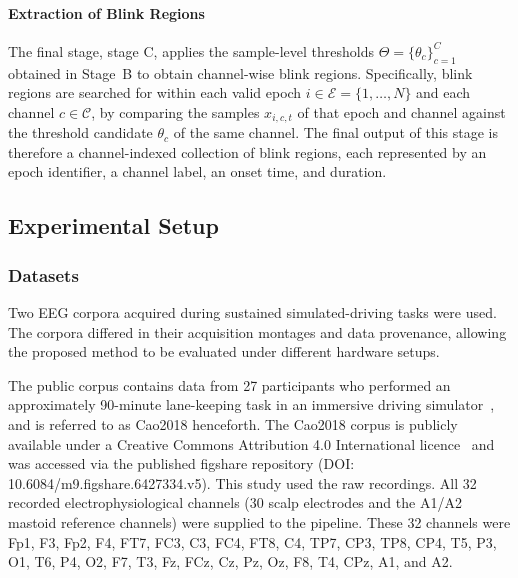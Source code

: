 \documentclass[journal,twoside,web]{ieeecolor}
\begin{document}
\paragraph{Extraction of Blink Regions}
The final stage, stage C, applies the sample-level thresholds
\(\Theta=\{\theta_c\}_{c=1}^{C}\) obtained in Stage~B to obtain channel-wise
blink regions. Specifically, blink regions are searched for within each valid
epoch \(i \in \mathcal{E}=\{1,\ldots,N\}\) and each channel
\(c \in \mathcal{C}\), by comparing the samples \(x_{i,c,t}\) of that epoch and
channel against the threshold candidate \(\theta_c\) of the same channel.
The final output of this stage is therefore a channel-indexed collection of blink regions, each represented by an epoch identifier, a channel label, an onset time, and duration.

%

 
%


\subsection{Experimental Setup}
\label{sec:exp_setup}


\subsubsection{Datasets}
\label{sec:datasets}
%
Two EEG corpora acquired during sustained simulated-driving tasks were used. The corpora differed in their acquisition montages and data provenance, allowing the proposed method to be evaluated under different hardware setups.

The public corpus contains data from 27 participants who performed an approximately 90-minute lane-keeping task in an immersive driving simulator~\citep{cao2019multichannel}, and is referred to as Cao2018 henceforth. The Cao2018 corpus is publicly available under a Creative Commons Attribution 4.0 International licence~\citep{cao2019multichannel} and was accessed via the published figshare repository (DOI: 10.6084/m9.figshare.6427334.v5). This study used the raw recordings. All 32 recorded electrophysiological channels (30 scalp electrodes and the A1/A2 mastoid reference channels) were supplied to the pipeline. These 32 channels were Fp1, F3, Fp2, F4, FT7, FC3, C3, FC4, FT8, C4, TP7, CP3, TP8, CP4, T5, P3, O1, T6, P4, O2, F7, T3, Fz, FCz, Cz, Pz, Oz, F8, T4, CPz, A1, and A2.
\end{document}
